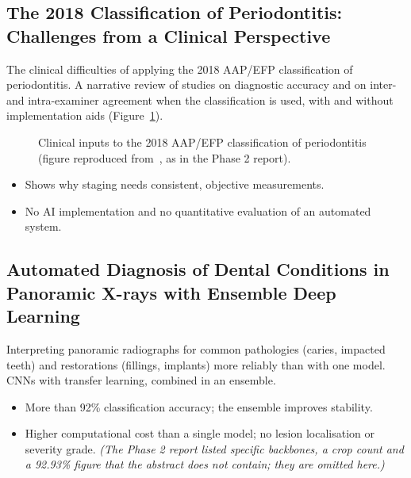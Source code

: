 \subsection{The 2018 Classification of Periodontitis: Challenges from a Clinical Perspective~\cite{chmielewski20252018}}
 The clinical difficulties of applying the 2018 AAP/EFP classification of
periodontitis.
 A narrative review of studies on diagnostic accuracy and on inter- and
intra-examiner agreement when the classification is used, with and without implementation aids
(Figure~\ref{fig:lit-aapefp}).

\begin{figure}[!htbp]
\centering
{}
\caption[Clinical inputs to the 2018 AAP/EFP classification]{Clinical inputs to the 2018 AAP/EFP
classification of periodontitis (figure reproduced from~\cite{chmielewski20252018}, as in the Phase 2
report).}
\label{fig:lit-aapefp}
\end{figure}

\begin{itemize}
\item Shows why staging needs consistent, objective measurements.
\end{itemize}
\begin{itemize}
\item No AI implementation and no quantitative evaluation of an automated system.
\end{itemize}

\subsection{Automated Diagnosis of Dental Conditions in Panoramic X-rays with Ensemble Deep Learning~\cite{gamal2025automated}}
 Interpreting panoramic radiographs for common pathologies (caries,
impacted teeth) and restorations (fillings, implants) more reliably than with one model.
 CNNs with transfer learning, combined in an ensemble.
\begin{itemize}
\item More than 92\% classification accuracy; the ensemble improves stability.
\end{itemize}
\begin{itemize}
\item Higher computational cost than a single model; no lesion localisation or severity grade.
  \emph{(The Phase 2 report listed specific backbones, a crop count and a 92.93\% figure that the
  abstract does not contain; they are omitted here.)}
\end{itemize}

